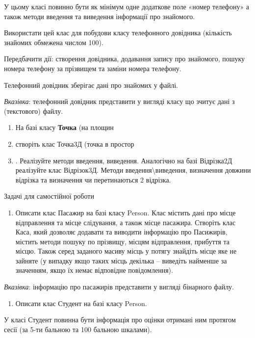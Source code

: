 \documentclass[]{article}
\makeatletter
\newcommand{\xslalph}[1]{\expandafter\@xslalph\csname c@#1\endcsname}
\newcommand{\@xslalph}[1]{%
    \ifcase#1\or а\or б\or в\or г\or д\or e\or є\or ж\or з\or i%
    \or й\or к\or л\or м\or н\or о\or п\or р\or с\or т%
    \or у\or ф\or х\or ц\or ч\or ш\or ю\or я\or аа\or бб\or вв%
    \else\@ctrerr\fi%
}
\makeatother
\begin{document}
\begin{enumerate}
\begin{enumerate}[label=\xslalph*)]
\begin{enumerate}
\begin{enumerate}[label=\xslalph*)]
У цьому класі повинно бути як мінімум одне додаткове поле «номер
телефону» а також методи введення та виведення інформації про знайомого.

Використати цей клас для побудови класу телефонного довідника (кількість
знайомих обмежена числом 100).

Передбачити дії: створення довідника, додавання запису про знайомого,
пошуку номера телефону за прізвищем та заміни номера телефону.

Телефонний довідник зберігає дані про знайомих у файлі.

\emph{\emph{Вказівка}}: телефонний довідник представити у вигляді класу
що зчитує дані з (текстового) файлу.

\begin{enumerate}
\def\labelenumi{\arabic{enumi})}
\item
  На базі класу \textbf{Точка} (на площин\item створіть клас Точка3Д (точка
  в простор\item. Реалізуйте методи введення, виведення. Аналогічно на базі
  Відрізка2Д реалізуйте клас Відрізок3Д. Методи
  введення\textbackslash{}виведення, визначення довжини відрізка та
  визначення чи перетинаються 2 відрізка.
\end{enumerate}

Задачі для самостійної роботи

\begin{enumerate}
\def\labelenumi{\arabic{enumi})}
\item
  Описати клас Пасажир на базі класу Person. Клас містить дані про місце
  відправлення та місце слідування, а також місце пасажира. Створіть
  клас Каса, який дозволяє додавати та виводити інформацію про
  Пасижирів, містить методи пошуку по прізвищу, місцям відправлення,
  прибуття та місцю. Також серед заданого масиву місць у потягу знайдіть
  місце яке не зайняте (у випадку якщо таких місць декілька -- виведіть
  найменше за значенням, якщо їх немає відповідне повідомлення).
\end{enumerate}

\emph{\emph{Вказівка}}: інформацію про пасажирів представити у вигляді
бінарного файлу.

\begin{enumerate}
\def\labelenumi{\arabic{enumi})}
\item
  Описати клас Студент на базі класу Person.
\end{enumerate}

У класі Студент повинна бути інформація про оцінки отримані ним протягом
сесії (за 5-ти бальною та 100 бальною шкалами).


\end{enumerate}
\end{enumerate}
\end{enumerate}
\end{enumerate}
\end{document}
